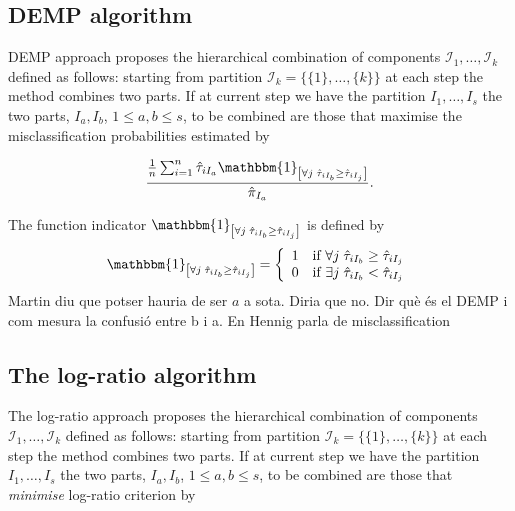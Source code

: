 \documentclass[10pt, a4paper]{article}
\begin{document}
\subsection*{DEMP algorithm}


DEMP approach \citep{hennig2010methods} proposes the hierarchical combination of components  $\mathcal{I}_1, \dots, \mathcal{I}_k$ defined as follows: starting from partition $\mathcal{I}_k = \{\{1\},\dots, \{k\}\}$ at each step the method combines two parts. If at current step we have the partition  $I_1, \dots, I_s$ the two parts, $I_a, I_b$, $1 \leq a,b \leq s$,  to be combined are those that maximise the misclassification probabilities estimated by 

\begin{equation}\label{demp_criteria}
\frac{ \frac{1}{n} \sum_{i=1}^n {\hat{\tau}_{iI_a} \mathbbm{1}_{\left[ \forall j\; \hat{\tau}_{i I_{b}} \geq \hat{\tau}_{iI_j} \right]}}}{ \hat{\pi}_{I_a}}.
\end{equation}

The function indicator $\mathbbm{1}_{\left[ \forall j\; \hat{\tau}_{i I_{b}} \geq \hat{\tau}_{iI_j} \right]}$ is defined by
\[
\mathbbm{1}_{\left[ \forall j\; \hat{\tau}_{i I_{b}} \geq \hat{\tau}_{iI_j} \right]} =
\left\{\begin{array}{ll}	
1 & \text{if $\forall j\; \hat{\tau}_{i I_{b}} \geq \hat{\tau}_{iI_j}$}\\
0 & \text{if $\exists j\; \hat{\tau}_{i I_{b}} < \hat{\tau}_{iI_j}$}
\end{array}\right.
\]
{\color{red} Martin diu que potser hauria de ser $a$ a sota.  Diria que no.}
{\color{red} Dir què és el DEMP i com mesura la confusió entre b i a. En Hennig parla de misclassification}

\subsection*{The log-ratio algorithm}

The log-ratio approach \citep{ComasCufi2013} proposes the hierarchical combination of components $\mathcal{I}_1, \dots, \mathcal{I}_k$ defined as follows: starting from partition $\mathcal{I}_k = \{\{1\},\dots, \{k\}\}$ at each step the method combines two parts. If at current step we have the partition  $I_1, \dots, I_s$ the two parts, $I_a, I_b$, $1 \leq a,b \leq s$,  to be combined are those that \emph{minimise} log-ratio criterion by
\end{document}
